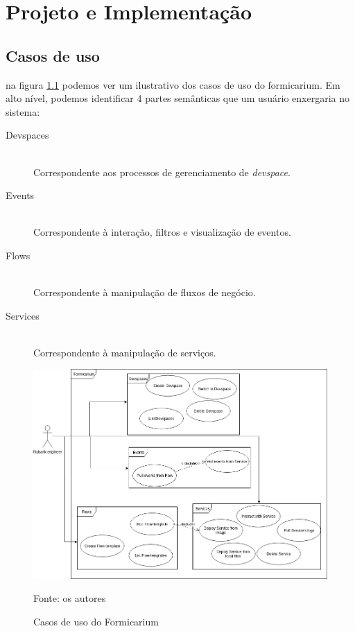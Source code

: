 \documentclass[twosideprint]{politex}
\newcommand{\legend}[1]{\begin{center}\def\caption{}\caption{#1}\end{center}}
\begin{document}
\chapter{Projeto e Implementação}
\section{Casos de uso}
na figura \ref{fig_uc} podemos ver um ilustrativo dos casos de uso do formicarium. Em alto nível, podemos identificar 4 partes semânticas que um usuário enxergaria no sistema: 
\begin{description}
  \item[Devspaces] \hfill \\ Correspondente aos processos de gerenciamento de \textit{devspace}.
  \item[Events] \hfill \\ Correspondente à interação, filtros e visualização de eventos.
  \item[Flows] \hfill \\ Correspondente à manipulação de fluxos de negócio.
  \item[Services] \hfill \\ Correspondente à manipulação de serviços.
\end{description}

		\begin{figure}[ht!]
			\caption{\label{fig_uc}Casos de uso do Formicarium}
			\begin{center}
			\includegraphics[scale=0.50]{pictures/formicarium-use-case-diagram.png}
			\end{center}
			\legend{Fonte: os autores}
		\end{figure}
	
\end{document}
